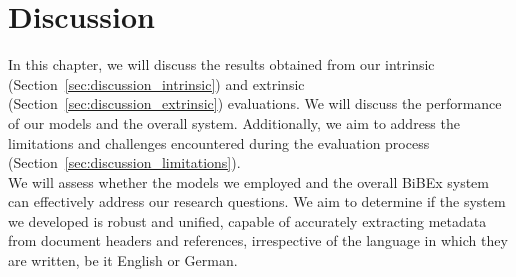 \chapter{Discussion}\label{chap:discussion}
In this chapter, we will discuss the results obtained from our intrinsic (Section~\ref{sec:discussion_intrinsic}) and extrinsic (Section~\ref{sec:discussion_extrinsic}) evaluations. We will discuss the performance of our models and the overall system. Additionally, we aim to address the limitations and challenges encountered during the evaluation process (Section~\ref{sec:discussion_limitations}).\\
We will assess whether the models we employed and the overall BiBEx system can effectively address our research questions. We aim to determine if the system we developed is robust and unified, capable of accurately extracting metadata from document headers and references, irrespective of the language in which they are written, be it English or German.

